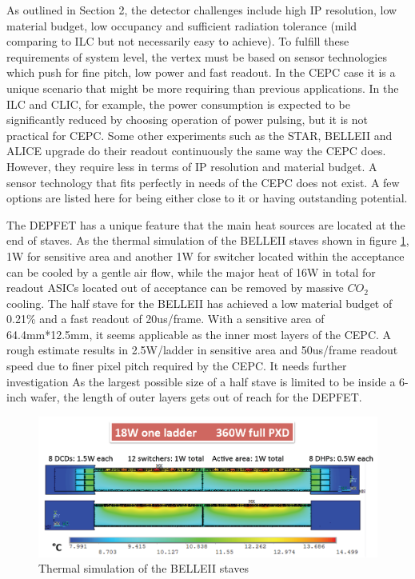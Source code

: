As outlined in Section 2, the detector challenges include high IP resolution, low material budget, low occupancy and sufficient radiation tolerance (mild comparing to ILC but not necessarily easy to achieve). To fulfill these requirements of system level, the vertex must be based on sensor technologies which push for fine pitch, low power and fast readout. In the CEPC case it is a unique scenario that might be more requiring than previous applications. In the ILC\cite{Behnke_2013} and CLIC\cite{linssen2012physics}, for example, the power consumption is expected to be significantly reduced by choosing operation of power pulsing, but it is not practical for CEPC. Some other experiments such as the STAR\cite{contin2015maps}, BELLEII\cite{lacasta2014depfet} and ALICE upgrade\cite{abelev2014technical} do their readout continuously the same way the CEPC does. However, they require less in terms of IP resolution and material budget. A sensor technology that fits perfectly in needs of the CEPC does not exist. A few options are listed here for being either close to it or having outstanding potential.


The DEPFET has a unique feature that the main heat sources are located at the end of staves. As the thermal simulation of the BELLEII staves shown in figure \ref{fig:thermal}, 1W for sensitive area and another 1W for switcher located within the acceptance can be cooled by a gentle air flow, while the major heat of 16W in total for readout ASICs located out of acceptance can be removed by massive $CO_{2}$ cooling. The half stave for the BELLEII has achieved a low material budget of 0.21\% and a fast readout of 20us/frame. With a sensitive area of 64.4mm*12.5mm, it seems applicable as the inner most layers of the CEPC. A rough estimate results in 2.5W/ladder in sensitive area and 50us/frame readout speed due to finer pixel pitch required by the CEPC. It needs further investigation As the largest possible size of a half stave is limited to be inside a 6-inch wafer, the length of outer layers gets out of reach for the DEPFET.
\begin{figure}[h!]
	\centering
	\includegraphics[scale=0.5]{Figures/Vertex/thermal_simu.png}
	\caption{Thermal simulation of the BELLEII staves}
	\label{fig:thermal}
\end{figure}


